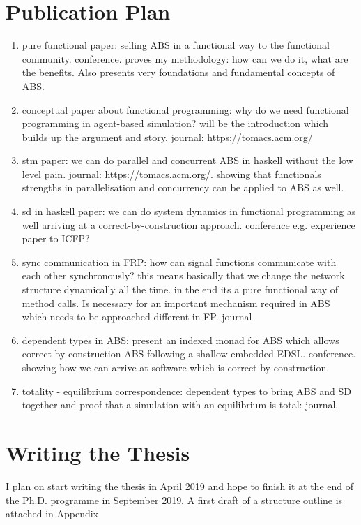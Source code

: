 \section{Publication Plan}
\begin{enumerate}
	\item pure functional paper: selling ABS in a functional way to the functional community. conference. proves my methodology: how can we do it, what are the benefits. Also presents very foundations and fundamental concepts of ABS.
	\item conceptual paper about functional programming: why do we need functional programming in agent-based simulation? will be the introduction which builds up the argument and story. journal: https://tomacs.acm.org/
	\item stm paper: we can do parallel and concurrent ABS in haskell without the low level pain. journal: https://tomacs.acm.org/. showing that functionals strengths in parallelisation and concurrency can be applied to ABS as well.
	\item sd in haskell paper: we can do system dynamics in functional programming as well arriving at a correct-by-construction approach. conference e.g. experience paper to ICFP? 
	\item sync communication in FRP: how can signal functions communicate with each other synchronously? this means basically that we change the network structure dynamically all the time. in the end its a pure functional way of method calls. Is necessary for an important mechanism required in ABS which needs to be approached different in FP. journal
	\item dependent types in ABS: present an indexed monad for ABS which allows correct by construction ABS following a shallow embedded EDSL. conference. showing how we can arrive at software which is correct by construction.
	\item totality - equilibrium correspondence: dependent types to bring ABS and SD together and proof that a simulation with an equilibrium is total: journal. 

\end{enumerate}

\section{Writing the Thesis}
I plan on start writing the thesis in April 2019 and hope to finish it at the end of the Ph.D. programme in September 2019. A first draft of a structure outline is attached in Appendix 

